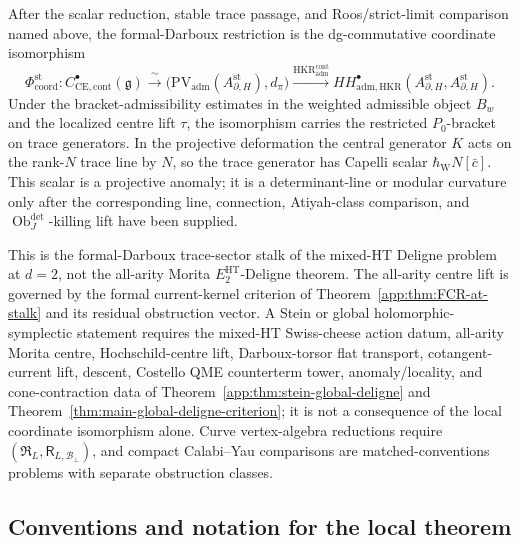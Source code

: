 \documentclass[11pt]{memoir}
\begin{document}
\begin{thm}
    After the scalar reduction, stable trace passage, and
    Roos/strict-limit comparison named above, the formal-Darboux
    restriction is the dg-commutative coordinate isomorphism
    \[
      \Phi_{\mathrm{coord}}^{\mathrm{st}}\colon
      C^\bullet_{\mathrm{CE},\mathrm{cont}}(\mathfrak g)
      \xrightarrow{\ \sim\ }
      \bigl(\mathrm{PV}_{\mathrm{adm}}
        (A_{\partial,H}^{\mathrm{st}}),d_\pi\bigr)
      \xrightarrow{\mathrm{HKR}^{\mathrm{cont}}_{\mathrm{adm}}}
      HH^\bullet_{\mathrm{adm},\mathrm{HKR}}
        (A_{\partial,H}^{\mathrm{st}},
         A_{\partial,H}^{\mathrm{st}}) .
    \]
    Under the bracket-admissibility estimates in the weighted
    admissible object \(B_w\) and the localized centre lift \(\tau\),
    the isomorphism carries the restricted \(P_0\)-bracket on trace
    generators.  In the projective deformation
    the central generator \(K\) acts on the rank-\(N\) trace line by
    \(N\), so the trace generator has Capelli scalar
    \(\hbar_{\mathrm{W}}N[\bar c]\).  This scalar is a projective anomaly; it is a
    determinant-line or modular curvature only after the corresponding
    line, connection, Atiyah-class comparison, and
    \(\operatorname{Ob}^{\det}_J\)-killing lift have been supplied.

    This is the formal-Darboux trace-sector stalk of the mixed-HT
    Deligne problem at \(d=2\), not the all-arity Morita
    \(E_2^{\mathrm{HT}}\)-Deligne theorem.  The all-arity centre lift is governed by
    the formal current-kernel criterion of
    Theorem~\ref{app:thm:FCR-at-stalk} and its residual obstruction
    vector.  A Stein or global holomorphic-symplectic statement requires
    the mixed-HT Swiss-cheese action datum, all-arity Morita centre,
    Hochschild-centre lift, Darboux-torsor flat transport,
    cotangent-current lift, descent, Costello QME counterterm tower,
    anomaly/locality, and cone-contraction data of
    Theorem~\ref{app:thm:stein-global-deligne} and
    Theorem~\ref{thm:main-global-deligne-criterion}; it is not a
    consequence of the local coordinate isomorphism alone.  Curve
    vertex-algebra reductions require
    \((\mathfrak R_L,\mathsf R_{L,\mathcal B_\perp})\), and compact
    Calabi--Yau comparisons are matched-conventions problems with
    separate obstruction classes.
  \end{thm}


  \tableofcontents
  \mbox{}



\subsection*{Conventions and notation for the local theorem}\label{ssec:local-theorem-conventions}
\end{document}
